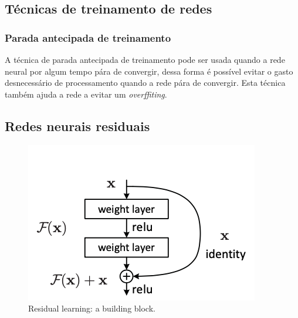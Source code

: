 		\subsection{Técnicas de treinamento de redes}
		
			\subsubsection{Parada antecipada de treinamento}
				\par A técnica de parada antecipada de treinamento pode ser usada quando a rede neural por algum tempo pára de convergir, dessa forma é possível evitar o gasto desnecessário de processamento quando a rede pára de convergir. Esta técnica também ajuda a rede a evitar um \textit{overffiting}.

		\subsection{Redes neurais residuais}

		\begin{figure}[H]
			\centering
			\includegraphics[width=0.7\linewidth]{images/ResidualLearnningBuildBlock}
			\caption[Residual learning: a building block.]{Residual learning: a building block.}
			\label{fig:residuallearnningbuildblock}
		\end{figure}
	
